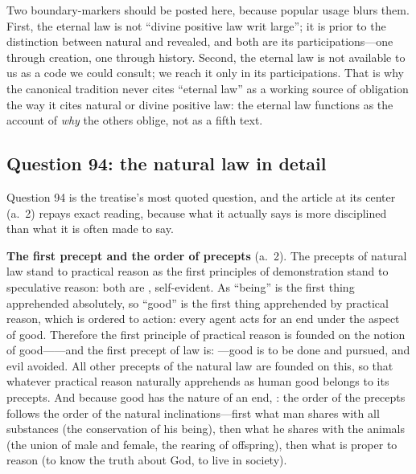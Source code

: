 Two boundary-markers should be posted here, because popular usage blurs them. First, the eternal law is not ``divine positive law writ large''; it is prior to the distinction between natural and revealed, and both are its participations---one through creation, one through history. Second, the eternal law is not available to us as a code we could consult; we reach it only in its participations. That is why the canonical tradition never cites ``eternal law'' as a working source of obligation the way it cites natural or divine positive law: the eternal law functions as the account of \emph{why} the others oblige, not as a fifth text.

\subsection{Question 94: the natural law in detail}

Question 94 is the treatise's most quoted question, and the article at its center (a.~2) repays exact reading, because what it actually says is more disciplined than what it is often made to say.

\textbf{The first precept and the order of precepts} (a.~2). The precepts of natural law stand to practical reason as the first principles of demonstration stand to speculative reason: both are , self-evident. As ``being'' is the first thing apprehended absolutely, so ``good'' is the first thing apprehended by practical reason, which is ordered to action: every agent acts for an end under the aspect of good. Therefore the first principle of practical reason is founded on the notion of good------and the first precept of law is: ---good is to be done and pursued, and evil avoided. All other precepts of the natural law are founded on this, so that whatever practical reason naturally apprehends as human good belongs to its precepts. And because good has the nature of an end, : the order of the precepts follows the order of the natural inclinations---first what man shares with all substances (the conservation of his being), then what he shares with the animals (the union of male and female, the rearing of offspring), then what is proper to reason (to know the truth about God, to live in society).

